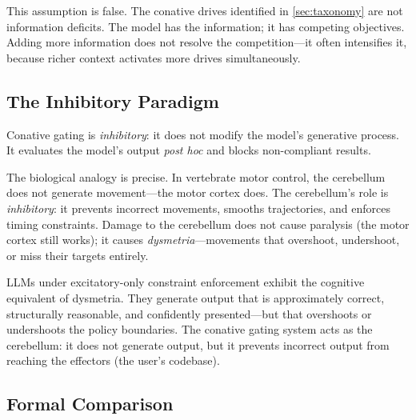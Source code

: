 \documentclass[11pt,a4paper]{article}
\begin{document}
This assumption is false.  The conative drives identified in
\cref{sec:taxonomy} are not information deficits.  The model has
the information; it has competing objectives.  Adding more
information does not resolve the competition---it often intensifies
it, because richer context activates more drives simultaneously.

\subsection{The Inhibitory Paradigm}

Conative gating is \emph{inhibitory}: it does not modify the model's
generative process.  It evaluates the model's output \emph{post hoc}
and blocks non-compliant results.

The biological analogy is precise.  In vertebrate motor control,
the cerebellum does not generate movement---the motor cortex does.
The cerebellum's role is \emph{inhibitory}: it prevents incorrect
movements, smooths trajectories, and enforces timing constraints.
Damage to the cerebellum does not cause paralysis (the motor cortex
still works); it causes \emph{dysmetria}---movements that overshoot,
undershoot, or miss their targets entirely.

LLMs under excitatory-only constraint enforcement exhibit the
cognitive equivalent of dysmetria.  They generate output that is
approximately correct, structurally reasonable, and confidently
presented---but that overshoots or undershoots the policy boundaries.
The conative gating system acts as the cerebellum: it does not
generate output, but it prevents incorrect output from reaching
the effectors (the user's codebase).

\subsection{Formal Comparison}
\end{document}
